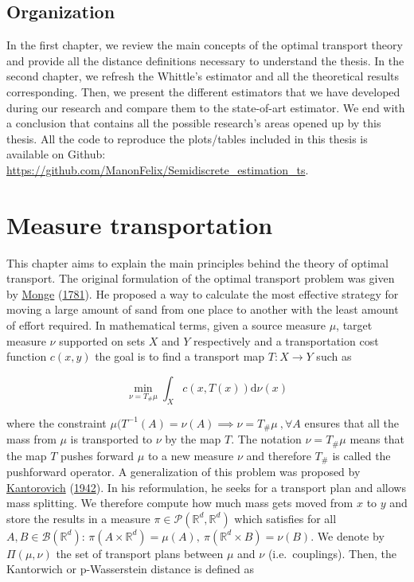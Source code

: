 \documentclass[
  11pt,
]{article}
\begin{document}
\hypertarget{organization}{%
\subsection{Organization}\label{organization}}

In the first chapter, we review the main concepts of the optimal
transport theory and provide all the distance definitions necessary to
understand the thesis. In the second chapter, we refresh the Whittle's
estimator and all the theoretical results corresponding. Then, we
present the different estimators that we have developed during our
research and compare them to the state-of-art estimator. We end with a
conclusion that contains all the possible research's areas opened up by
this thesis. All the code to reproduce the plots/tables included in this
thesis is available on Github:
\url{https://github.com/ManonFelix/Semidiscrete_estimation_ts}.

\hypertarget{measure-transportation}{%
\section{Measure transportation}\label{measure-transportation}}

This chapter aims to explain the main principles behind the theory of
optimal transport. The original formulation of the optimal transport
problem was given by \protect\hyperlink{ref-monge1781memoire}{Monge}
(\protect\hyperlink{ref-monge1781memoire}{1781}). He proposed a way to
calculate the most effective strategy for moving a large amount of sand
from one place to another with the least amount of effort required. In
mathematical terms, given a source measure \(\mu\), target measure
\(\nu\) supported on sets \(X\) and \(Y\) respectively and a
transportation cost function \(c(x,y)\) the goal is to find a transport
map \(T:X \rightarrow Y\) such as

\[\min _{\nu=T_{\#} \mu} \int_{X} c(x, T(x)) \mathrm{d} \nu(x)\]

where the constraint
\(\mu(T^{-1}(A) = \nu(A) \implies \nu=T_{\#} \mu \ , \forall A\) ensures
that all the mass from \(\mu\) is transported to \(\nu\) by the map
\(T\). The notation \(\nu=T_{\#} \mu\) means that the map \(T\) pushes
forward \(\mu\) to a new measure \(\nu\) and therefore \(T_{\#}\) is
called the pushforward operator. A generalization of this problem was
proposed by
\protect\hyperlink{ref-kantorovich1942translocation}{Kantorovich}
(\protect\hyperlink{ref-kantorovich1942translocation}{1942}). In his
reformulation, he seeks for a transport plan and allows mass splitting.
We therefore compute how much mass gets moved from \(x\) to \(y\) and
store the results in a measure
\(\pi \in \mathcal{P}\left(\mathbb{R}^{d}, \mathbb{R}^{d}\right)\) which
satisfies for all \(A, B \in \mathcal{B}\left(\mathbb{R}^{d}\right)\):
\(\pi\left(A \times \mathbb{R}^{d}\right)=\mu(A), \ \pi\left(\mathbb{R}^{d} \times B\right)=\nu(B).\)
We denote by \(\Pi(\mu, \nu)\) the set of transport plans between
\(\mu\) and \(\nu\) (i.e.~couplings). Then, the Kantorwich or
p-Wasserstein distance is defined as
\end{document}
